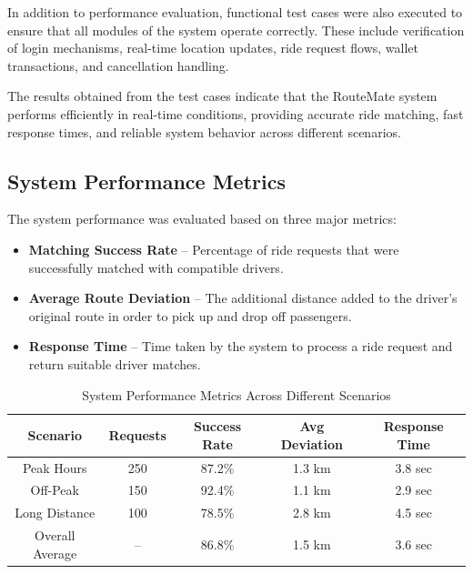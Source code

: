 \documentclass[10pt,a4paper]{report}
\begin{document}
\justify\large In addition to performance evaluation, functional test cases were
also executed to ensure that all modules of the system operate correctly. These
include verification of login mechanisms, real-time location updates, ride request
flows, wallet transactions, and cancellation handling.

\justify\large The results obtained from the test cases indicate that the RouteMate
system performs efficiently in real-time conditions, providing accurate ride
matching, fast response times, and reliable system behavior across different
scenarios.

\subsection{System Performance Metrics}

\justify\large The system performance was evaluated based on three major metrics:

\begin{itemize}

\item \textbf{Matching Success Rate} – Percentage of ride requests that were successfully matched with compatible drivers.

\item \textbf{Average Route Deviation} – The additional distance added to the driver's original route in order to pick up and drop off passengers.

\item \textbf{Response Time} – Time taken by the system to process a ride request and return suitable driver matches.

\end{itemize}

\begin{table}[h]
\centering
\begin{tabular}{|c|c|c|c|c|}
\hline
\textbf{Scenario} & \textbf{Requests} & \textbf{Success Rate} & \textbf{Avg Deviation} & \textbf{Response Time} \\
\hline
Peak Hours & 250 & 87.2\% & 1.3 km & 3.8 sec \\
\hline
Off-Peak & 150 & 92.4\% & 1.1 km & 2.9 sec \\
\hline
Long Distance & 100 & 78.5\% & 2.8 km & 4.5 sec \\
\hline
Overall Average & -- & 86.8\% & 1.5 km & 3.6 sec \\
\hline
\end{tabular}
\caption{System Performance Metrics Across Different Scenarios}
\end{table}
\end{document}
